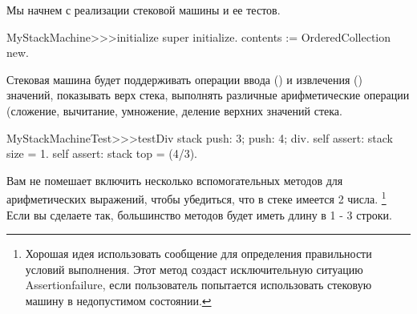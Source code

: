 \documentclass[a4paper,10pt,twoside]{book}
\begin{document}

Мы начнем с реализации стековой машины и ее тестов.



\begin{code}{}
MyStackMachine>>>initialize
	super initialize.
	contents := OrderedCollection new.
\end{code}


Стековая машина будет поддерживать операции ввода () и
извлечения () значений, показывать верх стека,
выполнять различные арифметические операции (сложение, вычитание,
умножение, деление верхних значений стека.



\begin{code}{}
MyStackMachineTest>>>testDiv
	stack
		push: 3;
		push: 4;
		div.
	self assert: stack size = 1.
	self assert: stack top = (4/3).
\end{code}


Вам не помешает включить несколько вспомогательных методов для
арифметических выражений, чтобы убедиться,
что в стеке имеется 2 числа.
\footnote{Хорошая идея использовать сообщение  для
определения правильности условий выполнения.
Этот метод создаст исключительную ситуацию Assertionfailure, если
пользователь попытается использовать стековую машину в недопустимом
состоянии.}
Если вы сделаете так, большинство методов будет иметь длину в 1 - 3 строки.
\end{document}
